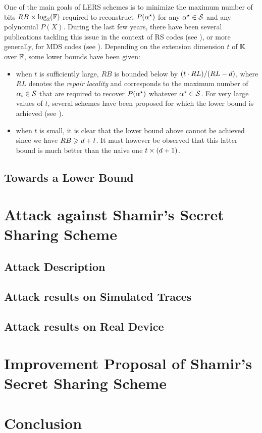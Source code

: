 \documentclass{llncs}
\begin{document}
One of the main goals of LERS schemes is to minimize the maximum number of bits $RB\times \log_2(\mathbb{F})$ required to reconstruct $P(\alpha^{\star})$ for any $\alpha^{\star}\in \mathcal{S}$ and any polynomial $P(X)$. During the last few years, there have been several publications tackling this issue in the context of RS codes (see \eg \cite{DRWS11,SPDC13}), or more generally, for MDS codes (see \eg \cite{CHJL11,DGWWR10,SR10}). Depending on the extension dimension $t$ of $\mathbb{K}$ over $\mathbb{F}$, some lower bounds have been given:
\begin{itemize}
\item when $t$ is sufficiently large, $RB$ is bounded below by $(t\cdot RL)/(RL-d)$, where $RL$ denotes the {\em repair locality} and corresponds to the maximum number of $\alpha_{i} \in \mathcal{S}$ that are required to recover $P(\alpha^{\star})$ whatever $\alpha^{\star} \in \mathcal{S}$. For very large values of $t$, several schemes have been proposed for which the lower bound is achieved (see \eg \cite{CHJL11,SR10}).
\item when $t$ is small, it is clear that the lower bound above cannot be achieved since we have $RB \geqslant d + t$. It must however be observed that this latter bound is much better than the naive one $t\times (d + 1)$. 
\end{itemize}
\subsection{Towards a Lower Bound}
 \todo{}

\section{Attack against Shamir's Secret Sharing Scheme }
\subsection{Attack Description}
\subsection{Attack results on Simulated Traces}
 \todo{}
\subsection{Attack results on Real Device}
 \todo{}


\section{Improvement Proposal of Shamir's Secret Sharing Scheme}
 \todo{}

\section{Conclusion}
\label{sec-conc}
 \todo{}
 


\end{document}
